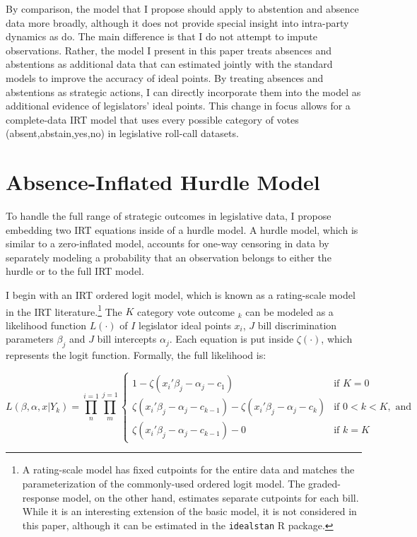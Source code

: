 	By comparison, the model that I propose should apply to abstention and absence data more broadly, although it does not provide special insight into intra-party dynamics as \textcite{rosas2015} do. The main difference is that I do not attempt to impute observations. Rather, the model I present in this paper treats absences and abstentions as additional data that can estimated jointly with the standard models to improve the accuracy of ideal points. By treating absences and abstentions as strategic actions, I can directly incorporate them into the model as additional evidence of legislators' ideal points. This change in focus allows for a complete-data IRT model that uses every possible category of votes (absent,abstain,yes,no) in legislative roll-call datasets.
	
	
	
	\section*{Absence-Inflated Hurdle Model}
	
	To handle the full range of strategic outcomes in legislative data, I propose embedding two IRT equations inside of a hurdle model. A hurdle model, which is similar to a zero-inflated model, accounts for one-way censoring in data by separately modeling a probability that an observation belongs to either the hurdle or to the full IRT model. 
	
	I begin with an IRT ordered logit model, which is known as a rating-scale model in the IRT literature.\footnote{A rating-scale model has fixed cutpoints for the entire data and matches the parameterization of the commonly-used ordered logit model. The graded-response model, on the other hand, estimates separate cutpoints for each bill. While it is an interesting extension of the basic model, it is not considered in this paper, although it can be estimated in the \texttt{idealstan} R package.} The $K$ category vote outcome $_k$ can be modeled as a likelihood function $L(\cdot)$ of $I$ legislator ideal points $x_i$, $J$ bill discrimination parameters $\beta_j$ and $J$ bill intercepts $\alpha_j$. Each equation is put inside $\zeta(\cdot)$, which represents the logit function. Formally, the full likelihood is:
	
					\[
	L(\beta,\alpha,x|Y_{k}) = \prod_{n}^{i=1} \prod_{m}^{j=1}
	\begin{cases} 
	1 -  \zeta(x_{i}'\beta_j - \alpha_j - c_1) & \text{if } K = 0 \\
	\zeta(x_{i}'\beta_j - \alpha_j - c_{k-1}) - \zeta(x_{i}'\beta_j - \alpha_j - c_{k})       & \text{if } 0 < k < K, \text{ and} \\
	\zeta(x_{i}'\beta_j - \alpha_j - c_{k-1}) - 0 & \text{if } k=K
	\end{cases}
	\]
	
